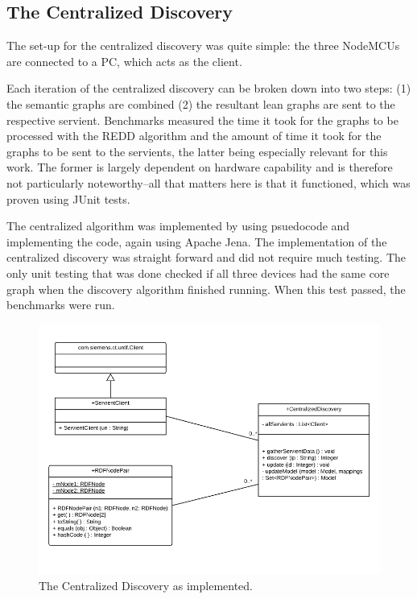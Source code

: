 \subsection{The Centralized Discovery}

The set-up for the centralized discovery was quite simple: the three NodeMCUs are connected to a PC, which acts as the client.

Each iteration of the centralized discovery can be broken down into two steps: (1) the semantic graphs are combined (2) the resultant lean graphs are sent to the respective servient. Benchmarks measured the time it took for the graphs to be processed with the REDD algorithm and the amount of time it took for the graphs to be sent to the servients, the latter being especially relevant for this work. The former is largely dependent on hardware capability and is therefore not particularly noteworthy--all that matters here is that it functioned, which was proven using JUnit tests.

The centralized algorithm was implemented by using psuedocode and implementing the code, again using Apache Jena. The implementation of the centralized discovery was straight forward and did not require much testing. The only unit testing that was done checked if all three devices had the same core graph when the discovery algorithm finished running. When this test passed, the benchmarks were run.



\begin{figure}[h]
\centering
\includegraphics[width=\textwidth]{Figures/centralizedUML.png}
\caption{The Centralized Discovery as implemented.}
\end{figure}


